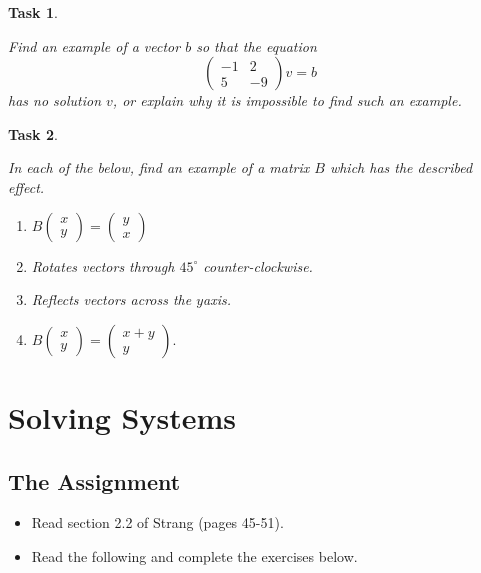 \documentclass[10pt,]{book}
\theoremstyle{plain}
\numberwithin{equation}{section}
\newtheorem{task}{Task}[chapter]
\begin{document}
\begin{task}
\label{task-36}

        Find an example of a vector \(b\) so that the equation\[
          \begin{pmatrix} -1 & 2 \\ 5 & -9 \end{pmatrix} v = b
        \]
        has no solution \(v\), or explain why it is impossible to find
        such an example.
      \end{task}
\begin{task}
\label{task-37}

        In each of the below, find an example of a matrix \(B\) which has the
        described effect.
        \begin{enumerate}
\item{}
            \(
              B\begin{pmatrix} x \\ y \end{pmatrix} = \begin{pmatrix}y \\ x \end{pmatrix}
            \)
          \item{}
            Rotates vectors through \(45^{\circ}\) counter-clockwise.
          \item{}
            Reflects vectors across the \(y\)axis.
          \item{}
            \(
              B\begin{pmatrix} x \\ y \end{pmatrix} =
              \begin{pmatrix} x+y \\ y \end{pmatrix}.
            \)
          \end{enumerate}
\end{task}
\clearpage
\typeout{************************************************}
\typeout{************************************************}
\section[Solving Systems]{Solving Systems}\label{elimination}
\typeout{************************************************}
\typeout{************************************************}
\subsection[The Assignment]{The Assignment}\label{subsection-24}
\begin{itemize}
\item{}Read section 2.2 of Strang (pages 45-51).\item{}Read the following and complete the exercises below.\end{itemize}
\typeout{************************************************}
\typeout{************************************************}
\end{document}
